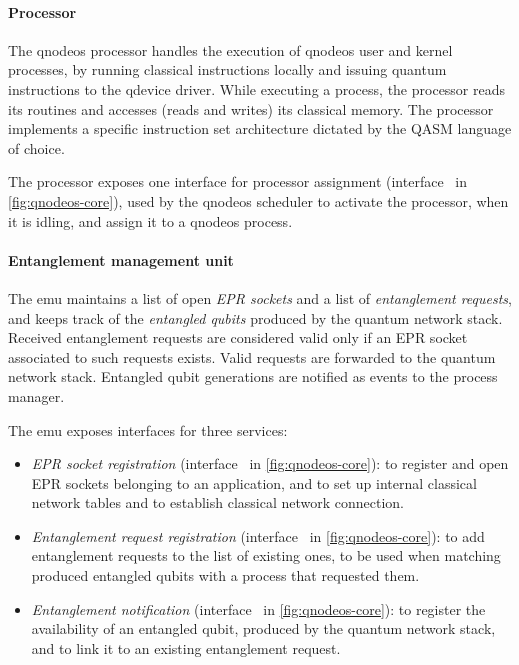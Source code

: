 \paragraph{Processor}

The \acrshort{qnodeos} processor handles the execution of \acrshort{qnodeos} user and kernel
processes, by running classical instructions locally and issuing quantum instructions to the
\acrshort{qdevice} driver. While executing a process, the processor reads its routines and accesses
(reads and writes) its classical memory. The processor implements a specific instruction set
architecture dictated by the QASM language of choice.

The processor exposes one interface for processor assignment (interface~ in
\cref{fig:qnodeos-core}), used by the \acrshort{qnodeos} scheduler to activate the processor, when
it is idling, and assign it to a \acrshort{qnodeos} process.

\paragraph{Entanglement management unit}

The \acrfull{emu} maintains a list of open \emph{EPR sockets} and a list of \emph{entanglement
requests}, and keeps track of the \emph{entangled qubits} produced by the quantum network stack.
Received entanglement requests are considered valid only if an EPR socket associated to such
requests exists. Valid requests are forwarded to the quantum network stack. Entangled qubit
generations are notified as events to the process manager.

The \acrshort{emu} exposes interfaces for three services:
\begin{itemize}
    \item \emph{EPR socket registration} (interface~ in \cref{fig:qnodeos-core}): to
          register and open EPR sockets belonging to an application, and to set up internal
          classical network tables and to establish classical network connection.
    \item \emph{Entanglement request registration} (interface~ in
          \cref{fig:qnodeos-core}): to add entanglement requests to the list of existing ones, to be
          used when matching produced entangled qubits with a process that requested them.
    \item \emph{Entanglement notification} (interface~ in \cref{fig:qnodeos-core}): to
          register the availability of an entangled qubit, produced by the quantum network stack,
          and to link it to an existing entanglement request.
\end{itemize}

